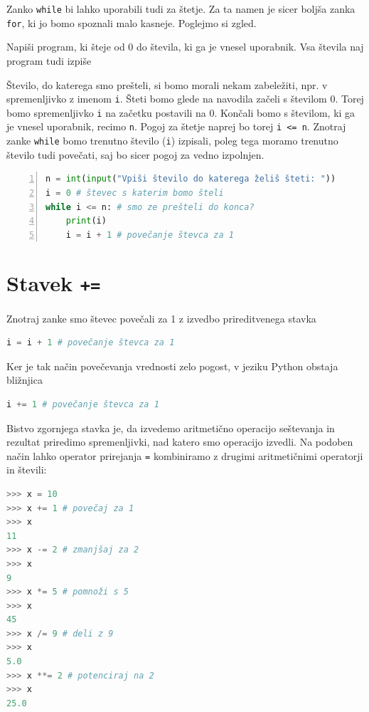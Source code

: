 Zanko \texttt{while} bi lahko uporabili tudi za štetje. Za ta namen je sicer boljša zanka \texttt{for}, ki jo bomo spoznali malo kasneje. Poglejmo si zgled.
\begin{zgled}
Napiši program, ki šteje od 0 do števila, ki ga je vnesel uporabnik. Vsa števila naj program tudi izpiše
\end{zgled}
\begin{resitev}
Število, do katerega smo prešteli, si bomo morali nekam zabeležiti, npr. v spremenljivko z imenom \texttt{i}. Šteti bomo glede na navodila začeli s številom 0. Torej bomo spremenljivko \texttt{i} na začetku postavili na 0. Končali bomo s številom, ki ga je vnesel uporabnik, recimo \texttt{n}. Pogoj za štetje naprej bo torej \texttt{i <= n}. Znotraj zanke \texttt{while} bomo trenutno število (\texttt{i}) izpisali, poleg tega moramo trenutno število tudi povečati, saj bo sicer pogoj za vedno izpolnjen. 
\begin{lstlisting}[language=Python, showstringspaces=false,numbers=left]
n = int(input("Vpiši število do katerega želiš šteti: "))
i = 0 # števec s katerim bomo šteli
while i <= n: # smo ze prešteli do konca?
    print(i)
    i = i + 1 # povečanje števca za 1
\end{lstlisting}
\end{resitev}

\section{Stavek \texttt{+=}}
Znotraj zanke smo števec povečali za 1 z izvedbo prireditvenega stavka
\begin{lstlisting}[language=Python, showstringspaces=false]
i = i + 1 # povečanje števca za 1
\end{lstlisting}
Ker je tak način povečevanja vrednosti zelo pogost, v jeziku Python obstaja bližnjica
\begin{lstlisting}[language=Python, showstringspaces=false]
i += 1 # povečanje števca za 1
\end{lstlisting}
Bistvo zgornjega stavka je, da izvedemo aritmetično operacijo seštevanja in rezultat priredimo spremenljivki, nad katero smo operacijo izvedli. Na podoben način lahko operator prirejanja \texttt{=} kombiniramo z drugimi aritmetičnimi operatorji in števili:
\begin{lstlisting}[language=Python, showstringspaces=false]
>>> x = 10
>>> x += 1 # povečaj za 1
>>> x
11
>>> x -= 2 # zmanjšaj za 2
>>> x
9
>>> x *= 5 # pomnoži s 5
>>> x
45
>>> x /= 9 # deli z 9
>>> x
5.0
>>> x **= 2 # potenciraj na 2
>>> x
25.0
\end{lstlisting}

